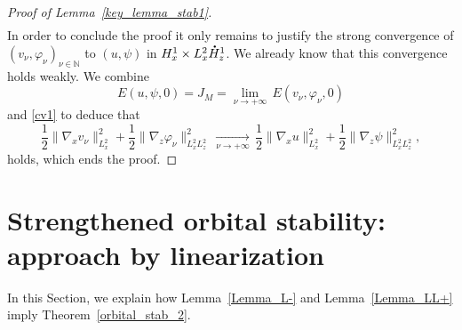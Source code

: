 \documentclass[JEP,XML,SOM,NoEqCountersInSection,NoFloatCountersInSection,Unicode,published]{cedram}
\theoremstyle{definition}
\newcommand*{\overbigdot}[1]{%
\accentset{\mbox{\large\bfseries .}}{#1}}
\newenvironment{ProofOf}[1]{\begin{proof}[Proof of #1]}{\end{proof}}
\begin{document}
\begin{ProofOf}{Lemma~\ref{key_lemma_stab1}}
\begin{multline*}
\end{multline*}
\egroup
In order to conclude the proof it only remains to justify the strong convergence of $(v_{\nu},\varphi_{\nu})_{\nu\in\mathbb N}$ to $(u,\psi)$ in $H_{x}^{1}\times L_{x}^{2}\overbigdot{H}_{z}^{1}$. We already know that this convergence holds weakly. We combine
\[
E(u,\psi,0)=J_{M}=\underset{\nu\to+\infty}{\lim}\,E(v_{\nu},\varphi_{\nu},0)
\]
and \eqref{cv1} to deduce that
\[
\frac{1}{2}\|\nabla_{x}v_{\nu}\|_{L_{x}^{2}}^{2}+\frac{1}{2}\|\nabla_{z}\varphi_{\nu}\|_{L_{x}^{2}L_{z}^{2}}^{2}\,\underset{\nu\to+\infty}{\to}\,\frac{1}{2}\|\nabla_{x}u\|_{L_{x}^{2}}^{2}+\frac{1}{2}\|\nabla_{z}\psi\|_{L_{x}^{2}L_{z}^{2}}^{2},
\]
holds, which ends the proof.
\end{ProofOf}

\section{Strengthened orbital stability: approach by linearization}\label{OrbitalStability2}

In this Section, we explain how Lemma~\ref{Lemma_L-} and Lemma~\ref{Lemma_LL+} imply Theorem~\ref{orbital_stab_2}.
\end{document}
